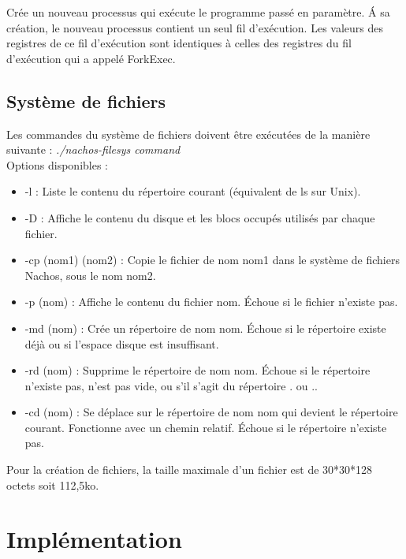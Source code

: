 \documentclass[12pt]{report}
\begin{document}
Crée un nouveau processus qui exécute le programme passé en paramètre. \'A sa création, le nouveau processus contient un seul fil d'exécution. Les valeurs des registres de ce fil d'exécution sont identiques à celles des registres du fil d'exécution qui a appelé ForkExec.
\bigskip


\section{Système de fichiers}

Les commandes du système de fichiers doivent être exécutées de la manière suivante :
\textit{./nachos-filesys command}\\

Options disponibles :\\
\begin{itemize}\renewcommand{\labelitemi}{$\bullet$}
\item -l  : Liste le contenu du répertoire courant (équivalent de ls sur Unix).
\item  -D  : Affiche le contenu du disque et les blocs occupés utilisés par chaque fichier.
\item  -cp (nom1) (nom2) : Copie le fichier de nom nom1 dans le système de fichiers Nachos, sous le nom nom2.
\item  -p (nom) : Affiche le contenu du fichier nom. Échoue si le fichier n'existe pas.
\item  -md (nom) : Crée un répertoire de nom nom. Échoue si le répertoire existe déjà ou si l'espace disque est insuffisant.
\item  -rd (nom) : Supprime le répertoire de nom nom. Échoue si le répertoire n'existe pas, n'est pas vide, ou s'il s'agit du répertoire . ou ..
\item -cd (nom) : Se déplace sur le répertoire de nom nom qui devient le répertoire courant. Fonctionne avec un chemin relatif. Échoue si le répertoire n'existe pas.
\end{itemize}









Pour la création de fichiers, la taille maximale d'un fichier est de 30*30*128 octets soit 112,5ko.





\chapter{Implémentation}
\end{document}
